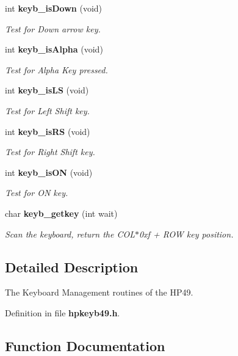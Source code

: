 \begin{CompactItemize}
int {\bf keyb\_\-is\-Down} (void)
\begin{CompactList}\small\item\em Test for Down arrow key.\item\end{CompactList}\item 
int {\bf keyb\_\-is\-Alpha} (void)
\begin{CompactList}\small\item\em Test for Alpha Key pressed.\item\end{CompactList}\item 
int {\bf keyb\_\-is\-LS} (void)
\begin{CompactList}\small\item\em Test for Left Shift key.\item\end{CompactList}\item 
int {\bf keyb\_\-is\-RS} (void)
\begin{CompactList}\small\item\em Test for Right Shift key.\item\end{CompactList}\item 
int {\bf keyb\_\-is\-ON} (void)
\begin{CompactList}\small\item\em Test for ON key.\item\end{CompactList}\item 
char {\bf keyb\_\-getkey} (int wait)
\begin{CompactList}\small\item\em Scan the keyboard, return the COL$\ast$0xf + ROW key position.\item\end{CompactList}\end{CompactItemize}


\subsection{Detailed Description}
The Keyboard Management routines of the HP49.





Definition in file {\bf hpkeyb49.h}.

\subsection{Function Documentation}
